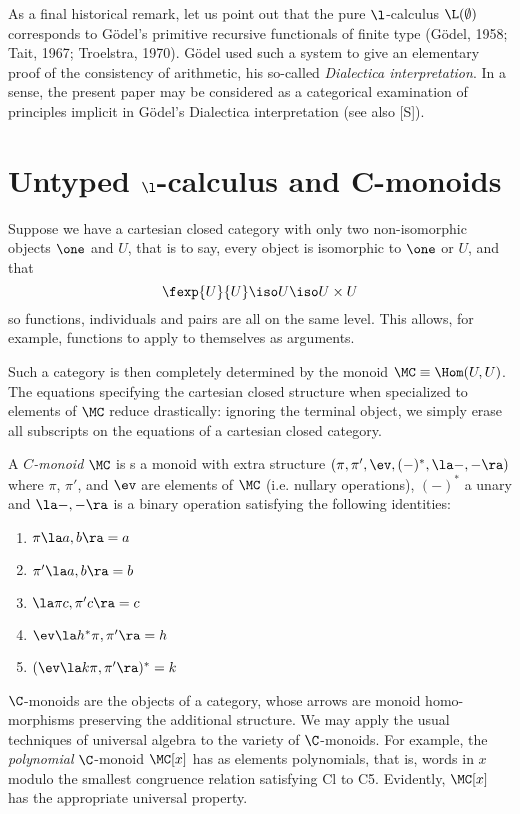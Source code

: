 As a final historical remark, let us point out that the pure $\l$-calculus
$\L(\emptyset)$ corresponds to G\"odel's primitive recursive functionals of finite type
(G\"odel, 1958; Tait, 1967; Troelstra, 1970). G\"odel used such a system to give
an elementary proof of the consistency of arithmetic, his so-called {\em Dialectica
interpretation}. In a sense, the present paper may be considered as a
categorical examination of principles implicit in G\"odel's Dialectica
interpretation (see also [S]).

\section{Untyped $\l$-calculus and C-monoids}

Suppose we have a cartesian closed category with only two non-isomorphic
objects $\one$ and $U$, that is to say, every object is isomorphic to $\one$ or $U$,
and that
\[
\fexp{U}{U} \iso U \iso U \times U
\]
so functions, individuals and pairs are all on the same level. This allows,
for example, functions to apply to themselves as arguments.

Such a category is then completely determined by the monoid $\MC \equiv \Hom(U,U)$.
The equations specifying the cartesian closed structure when specialized to
elements of $\MC$ reduce drastically: ignoring the terminal object, we simply
erase all subscripts on the equations of a cartesian closed category.

\begin{defn}
A {\em $C$-monoid} $\MC$ is s a monoid with extra structure
$(\pi, \pi', \ev, (-)^*, \la -,- \ra)$ where $\pi$, $\pi'$, and $\ev$ are
elements of $\MC$ (i.e. nullary operations), $(-)^*$ a unary and $\la -,- \ra$ is
a binary operation satisfying the following identities:
\begin{enumerate}[label=C\theenumi.]
\item $\pi\la a,b\ra = a$
\item $\pi'\la a,b\ra = b$
\item $\la \pi c, \pi' c \ra = c$
\item $\ev \la h^*\pi, \pi' \ra = h$
\item $(\ev \la k\pi, \pi' \ra)^* = k$
\end{enumerate}
\end{defn}

$\C$-monoids are the objects of a category, whose arrows are monoid homo-
morphisms preserving the additional structure. We may apply the usual
techniques of universal algebra to the variety of $\C$-monoids. For example, the
{\em polynomial} $\C$-monoid $\MC[x]$ has as elements polynomials, that is, words in $x$
modulo the smallest congruence relation satisfying Cl to C5. Evidently,
$\MC[x]$ has the appropriate universal property.

